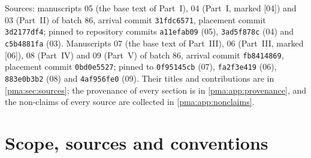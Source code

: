 \documentclass[11pt]{article}
\numberwithin{equation}{section}
\theoremstyle{definition}
\theoremstyle{remark}
\newcommand{\src}[1]{\textup{\textsf{\small[#1]}}}
\begin{document}
\begin{titlepage}
\begin{minipage}{\textwidth}
\begin{abstract}
The report merges seven manuscripts written independently on these subjects;
it states which source proved each result, prints shared results once or as
marked second routes, keeps every source's limitations, and cites the
collection's earlier results instead of reprinting them as new. It is an
AI-assisted draft: it has not been refereed, and nothing in it has been
formalized.
\end{abstract}
\end{minipage}
\vfill
\begin{minipage}{\textwidth}
\footnotesize
Sources: manuscripts 05 (the base text of Part~I), 04 (Part~I, marked
\src{04}) and 03 (Part~II) of batch 86, arrival commit \texttt{31fdc6571},
placement commit \texttt{3d2177df4}; pinned to repository commits
\texttt{a11efab09} (05), \texttt{3ad5f878c} (04) and \texttt{c5b4881fa} (03).
Manuscripts 07 (the base text of Part~III), 06 (Part~III, marked \src{06}),
08 (Part~IV) and 09 (Part~V) of batch 86, arrival commit
\texttt{fb8414869}, placement commit \texttt{0bd0e5527}; pinned to
\texttt{0f95145cb} (07), \texttt{fa2f3e419} (06), \texttt{883e0b3b2} (08) and
\texttt{4af956fe0} (09).
Their titles and contributions are in \cref{pma:sec:sources}; the provenance
of every section is in \cref{pma:app:provenance}, and the non-claims of
every source are collected in \cref{pma:app:nonclaims}.
\end{minipage}
\end{titlepage}
\hypersetup{pageanchor=true}
{\setlength{\parskip}{0pt}\small
\tableofcontents
}
\clearpage

\section{Scope, sources and conventions}\label{pma:sec:intro}
\end{document}

